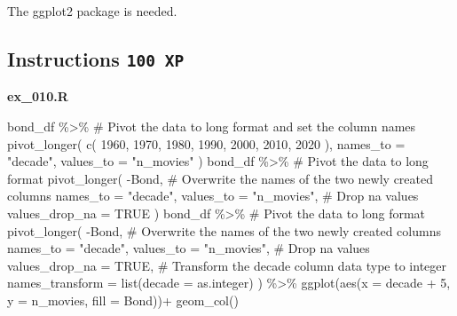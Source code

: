 \documentclass[
  letterpaper,
  DIV=11,
  numbers=noendperiod]{scrreprt}
\newenvironment{Shaded}{\begin{snugshade}}{\end{snugshade}}
\newcommand{\AttributeTok}[1]{\textcolor[rgb]{0.40,0.45,0.13}{#1}}
\newcommand{\CommentTok}[1]{\textcolor[rgb]{0.37,0.37,0.37}{#1}}
\newcommand{\ConstantTok}[1]{\textcolor[rgb]{0.56,0.35,0.01}{#1}}
\newcommand{\DecValTok}[1]{\textcolor[rgb]{0.68,0.00,0.00}{#1}}
\newcommand{\FunctionTok}[1]{\textcolor[rgb]{0.28,0.35,0.67}{#1}}
\newcommand{\NormalTok}[1]{\textcolor[rgb]{0.00,0.23,0.31}{#1}}
\newcommand{\SpecialCharTok}[1]{\textcolor[rgb]{0.37,0.37,0.37}{#1}}
\newcommand{\StringTok}[1]{\textcolor[rgb]{0.13,0.47,0.30}{#1}}
\begin{document}
The ggplot2 package is needed.

\hypertarget{instructions-100-xp-9}{%
\subsection*{\texorpdfstring{Instructions
\texttt{100\ XP}}{Instructions 100 XP}}\label{instructions-100-xp-9}}

\textbf{ex\_010.R}

\begin{Shaded}
\begin{Highlighting}[]
\NormalTok{bond\_df }\SpecialCharTok{\%\textgreater{}\%} 
  \CommentTok{\# Pivot the data to long format and set the column names}
\FunctionTok{pivot\_longer}\NormalTok{(}
  \FunctionTok{c}\NormalTok{(}
    \StringTok{\textasciigrave{}}\AttributeTok{1960}\StringTok{\textasciigrave{}}\NormalTok{,}
    \StringTok{\textasciigrave{}}\AttributeTok{1970}\StringTok{\textasciigrave{}}\NormalTok{,}
    \StringTok{\textasciigrave{}}\AttributeTok{1980}\StringTok{\textasciigrave{}}\NormalTok{,}
    \StringTok{\textasciigrave{}}\AttributeTok{1990}\StringTok{\textasciigrave{}}\NormalTok{,}
    \StringTok{\textasciigrave{}}\AttributeTok{2000}\StringTok{\textasciigrave{}}\NormalTok{,}
    \StringTok{\textasciigrave{}}\AttributeTok{2010}\StringTok{\textasciigrave{}}\NormalTok{,}
    \StringTok{\textasciigrave{}}\AttributeTok{2020}\StringTok{\textasciigrave{}}
\NormalTok{  ),}
  \AttributeTok{names\_to =} \StringTok{"decade"}\NormalTok{,}
  \AttributeTok{values\_to =} \StringTok{"n\_movies"}
\NormalTok{)}
\NormalTok{bond\_df }\SpecialCharTok{\%\textgreater{}\%} 
  \CommentTok{\# Pivot the data to long format}
  \FunctionTok{pivot\_longer}\NormalTok{(}
    \SpecialCharTok{{-}}\NormalTok{Bond, }
    \CommentTok{\# Overwrite the names of the two newly created columns}
    \AttributeTok{names\_to =} \StringTok{"decade"}\NormalTok{, }
    \AttributeTok{values\_to =} \StringTok{"n\_movies"}\NormalTok{, }
    \CommentTok{\# Drop na values}
    \AttributeTok{values\_drop\_na =} \ConstantTok{TRUE}
\NormalTok{  )}
\NormalTok{  bond\_df }\SpecialCharTok{\%\textgreater{}\%} 
  \CommentTok{\# Pivot the data to long format}
  \FunctionTok{pivot\_longer}\NormalTok{(}
    \SpecialCharTok{{-}}\NormalTok{Bond, }
    \CommentTok{\# Overwrite the names of the two newly created columns}
    \AttributeTok{names\_to =} \StringTok{"decade"}\NormalTok{, }
    \AttributeTok{values\_to =} \StringTok{"n\_movies"}\NormalTok{, }
    \CommentTok{\# Drop na values}
    \AttributeTok{values\_drop\_na =} \ConstantTok{TRUE}\NormalTok{, }
    \CommentTok{\# Transform the decade column data type to integer}
    \AttributeTok{names\_transform =} \FunctionTok{list}\NormalTok{(}\AttributeTok{decade =}\NormalTok{ as.integer)  }
\NormalTok{  ) }\SpecialCharTok{\%\textgreater{}\%} 
  \FunctionTok{ggplot}\NormalTok{(}\FunctionTok{aes}\NormalTok{(}\AttributeTok{x =}\NormalTok{ decade }\SpecialCharTok{+} \DecValTok{5}\NormalTok{, }\AttributeTok{y =}\NormalTok{ n\_movies, }\AttributeTok{fill =}\NormalTok{ Bond))}\SpecialCharTok{+}
  \FunctionTok{geom\_col}\NormalTok{()}
\end{Highlighting}
\end{Shaded}
\end{document}
